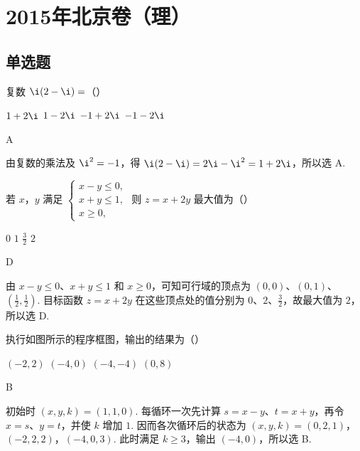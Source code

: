 \chapter{2015年北京卷（理）}

\section{单选题}

\begin{problem}
复数 \(\i(2 - \i) =\)（\quad）

\choices
    {\(1 + 2\i\)}
    {\(1 - 2\i\)}
    {\(-1 + 2\i\)}
    {\(-1 - 2\i\)}

\begin{answer}
A
\end{answer}

\begin{solution}
由复数的乘法及 \(\i^2=-1\)，得 \(\i(2-\i)=2\i-\i^2=1+2\i\)，所以选 A.
\end{solution}
\end{problem}

\begin{problem}
若 \(x\)，\(y\) 满足 \(\begin{cases}
x - y \leqslant 0,\\
x + y \leqslant 1,\\
x \geqslant 0,
\end{cases}\) 则 \(z = x + 2y\) 最大值为（\quad）

\choices
    {\(0\)}
    {\(1\)}
    {\( \frac{3}{2} \)}
    {\(2\)}

\begin{answer}
D
\end{answer}

\begin{solution}
由 \(x-y\leqslant0\)、\(x+y\leqslant1\) 和 \(x\geqslant0\)，可知可行域的顶点为 \((0,0)\)、\((0,1)\)、\(\left(\frac{1}{2},\frac{1}{2}\right)\). 目标函数 \(z=x+2y\) 在这些顶点处的值分别为 \(0\)、\(2\)、\(\frac{3}{2}\)，故最大值为 \(2\)，所以选 D.
\end{solution}
\end{problem}

\begin{problem}
执行如图所示的程序框图，输出的结果为（\quad）


\choices
    {\((-2, 2)\)}
    {\((-4,0)\)}
    {\((-4, -4)\)}
    {\((0, 8)\)}

\begin{answer}
B
\end{answer}

\begin{solution}
初始时 \((x,y,k)=(1,1,0)\). 每循环一次先计算 \(s=x-y\)、\(t=x+y\)，再令 \(x=s\)、\(y=t\)，并使 \(k\) 增加 \(1\). 因而各次循环后的状态为
\((x,y,k)=(0,2,1)\)，\((-2,2,2)\)，\((-4,0,3)\).
此时满足 \(k\geqslant3\)，输出 \((-4,0)\)，所以选 B.
\end{solution}
\end{problem}

